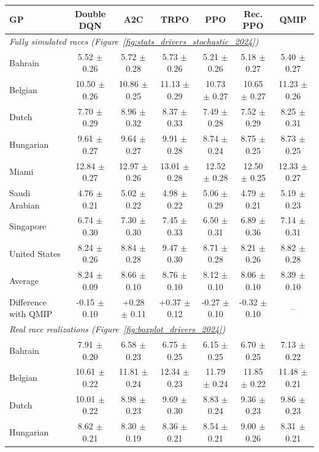 \begin{tabular}{lcccccc}
\toprule
GP & Double DQN & A2C & TRPO & PPO & Rec. PPO & QMIP \\
\midrule
\multicolumn{7}{l}{\textit{Fully simulated races (Figure~\ref{fig:stats_drivers_stochastic_2024})}} \\
\midrule
Bahrain & 5.52 $\pm$ 0.26 & 5.72 $\pm$ 0.28 & 5.73 $\pm$ 0.26 & 5.21 $\pm$ 0.26 & 5.18 $\pm$ 0.27 & 5.40 $\pm$ 0.27 \\
Belgian & 10.50 $\pm$ 0.26 & 10.86 $\pm$ 0.25 & 11.13 $\pm$ 0.29 & 10.73 $\pm$ 0.27 & 10.65 $\pm$ 0.27 & 11.23 $\pm$ 0.26 \\
Dutch & 7.70 $\pm$ 0.29 & 8.96 $\pm$ 0.32 & 8.37 $\pm$ 0.33 & 7.49 $\pm$ 0.28 & 7.52 $\pm$ 0.29 & 8.25 $\pm$ 0.31 \\
Hungarian & 9.61 $\pm$ 0.27 & 9.64 $\pm$ 0.27 & 9.91 $\pm$ 0.28 & 8.74 $\pm$ 0.24 & 8.75 $\pm$ 0.25 & 8.73 $\pm$ 0.25 \\
Miami & 12.84 $\pm$ 0.27 & 12.97 $\pm$ 0.26 & 13.01 $\pm$ 0.28 & 12.52 $\pm$ 0.28 & 12.50 $\pm$ 0.25 & 12.33 $\pm$ 0.27 \\
Saudi Arabian & 4.76 $\pm$ 0.21 & 5.02 $\pm$ 0.22 & 4.98 $\pm$ 0.22 & 5.06 $\pm$ 0.29 & 4.79 $\pm$ 0.21 & 5.19 $\pm$ 0.23 \\
Singapore & 6.74 $\pm$ 0.30 & 7.30 $\pm$ 0.30 & 7.45 $\pm$ 0.33 & 6.50 $\pm$ 0.31 & 6.89 $\pm$ 0.36 & 7.14 $\pm$ 0.31 \\
United States & 8.24 $\pm$ 0.26 & 8.84 $\pm$ 0.28 & 9.47 $\pm$ 0.30 & 8.71 $\pm$ 0.28 & 8.21 $\pm$ 0.26 & 8.82 $\pm$ 0.28 \\
\midrule
Average & 8.24 $\pm$ 0.09 & 8.66 $\pm$ 0.10 & 8.76 $\pm$ 0.10 & 8.12 $\pm$ 0.10 & 8.06 $\pm$ 0.10 & 8.39 $\pm$ 0.10 \\
Difference with QMIP & -0.15 $\pm$ 0.10 & +0.28 $\pm$ 0.11 & +0.37 $\pm$ 0.12 & -0.27 $\pm$ 0.10 & -0.32 $\pm$ 0.10 & -- \\
\midrule
\multicolumn{7}{l}{\textit{Real race realizations (Figure~\ref{fig:boxplot_drivers_2024})}} \\
\midrule
Bahrain & 7.91 $\pm$ 0.20 & 6.58 $\pm$ 0.23 & 6.75 $\pm$ 0.25 & 6.15 $\pm$ 0.25 & 6.70 $\pm$ 0.25 & 7.13 $\pm$ 0.22 \\
Belgian & 10.61 $\pm$ 0.22 & 11.81 $\pm$ 0.24 & 12.34 $\pm$ 0.23 & 11.79 $\pm$ 0.24 & 11.85 $\pm$ 0.22 & 11.48 $\pm$ 0.21 \\
Dutch & 10.01 $\pm$ 0.22 & 8.98 $\pm$ 0.23 & 9.69 $\pm$ 0.30 & 8.83 $\pm$ 0.24 & 9.36 $\pm$ 0.23 & 9.86 $\pm$ 0.23 \\
Hungarian & 8.62 $\pm$ 0.21 & 8.30 $\pm$ 0.19 & 8.36 $\pm$ 0.21 & 8.54 $\pm$ 0.21 & 9.00 $\pm$ 0.26 & 8.31 $\pm$ 0.21 \\

\end{tabular}
